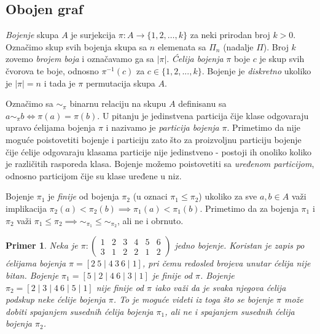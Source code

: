 \documentclass[12pt,oneside]{memoir}
\newtheorem{example}{Primer}
\theoremstyle{definition}
\begin{document}
  \subsection{Obojen graf}

   \emph{Bojenje} skupa $A$ je surjekcija $\pi : A \to \{1, 2, \dots, k\}$ za
   neki prirodan broj $k > 0$. Označimo skup svih bojenja skupa sa $n$
   elemenata sa $\Pi_n$ (nadalje $\Pi$).  Broj $k$ zovemo \emph{brojem boja} i
   označavamo ga sa $|\pi|$.  \emph{Ćelija bojenja} $\pi$ boje $c$ je skup svih
   čvorova te boje, odnosno $\pi^{-1}(c)$ za $c \in \{1, 2, ..., k\}$.  Bojenje
   je \emph{diskretno} ukoliko je $|\pi| = n$ i tada je $\pi$ permutacija skupa
   $A$.

   Označimo sa $\sim_\pi$ binarnu relaciju na skupu $A$ definisanu sa $a
   \sim_\pi b \iff \pi(a) = \pi(b)$. U pitanju je jedinstvena particija čije
   klase odgovaraju upravo ćelijama bojenja $\pi$ i nazivamo je \emph{particija
   bojenja} $\pi$. Primetimo da nije moguće poistovetiti bojenje i particiju
   zato što za proizvoljnu particiju bojenje čije ćelije odgovaraju klasama
   particije nije jedinstveno - postoji ih onoliko koliko je različitih
   rasporeda klasa.  Bojenje možemo poistovetiti sa \emph{uređenom particijom},
   odnosno particijom čije su klase uređene u niz.

   Bojenje $\pi_1$ je \emph{finije} od bojenja $\pi_2$ (u oznaci $\pi_1 \leq \pi_2$)
   ukoliko za sve $a, b \in A$ važi implikacija $\pi_2(a) < \pi_2(b) \implies
   \pi_1(a) < \pi_1(b)$.  Primetimo da za bojenja $\pi_1$ i $\pi_2$ važi $\pi_1
   \leq \pi_2 \implies {\sim_{\pi_1}} \leq {\sim_{\pi_2}}$, ali ne i obrnuto.

   \begin{example}
	   Neka je $\pi :
	   \begin{pmatrix}
		   1 & 2 & 3 & 4 & 5 & 6 \\
		   3 & 1 & 2 & 2 & 1 & 2
	   \end{pmatrix}$
	   jedno bojenje. Koristan je zapis po ćelijama bojenja $\pi = [2\ 5 \mid
	   4\ 3\ 6 \mid 1]$, pri čemu redosled brojeva unutar ćelija nije bitan.
	   Bojenje $\pi_1 = [5 \mid 2 \mid 4\ 6 \mid 3 \mid 1]$ je finije od $\pi$.
	   Bojenje $\pi_2 = [2 \mid 3 \mid 4\ 6 \mid 5 \mid 1]$ nije finije od
	   $\pi$ iako važi da je svaka njegova ćelija podskup neke ćelije bojenja
	   $\pi$. To je moguće videti iz toga što se bojenje $\pi$ može dobiti
	   spajanjem susednih ćelija bojenja $\pi_1$, ali ne i spajanjem susednih
	   ćelija bojenja $\pi_2$.
   \end{example}
\end{document}
